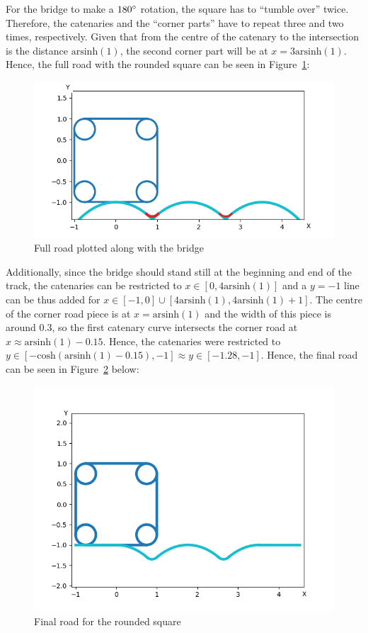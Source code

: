 \documentclass[12pt]{article}
\begin{document}
        For the bridge to make a $180\degree$ rotation, the square has to ``tumble over'' twice. Therefore, the catenaries and the ``corner parts'' have to repeat three and two times, respectively. Given that from the centre of the catenary to the intersection is the distance $\text{arsinh}(1)$, the second corner part will be at $x=3\text{arsinh}(1)$. Hence, the full road with the rounded square can be seen in Figure~\ref{fig:bridge_full}:
        \begin{figure}[H]
            \centering
            \includegraphics[width=0.75\linewidth]{images/road_with_square.png}
            \caption{Full road plotted along with the bridge}\label{fig:bridge_full}
        \end{figure}

        Additionally, since the bridge should stand still at the beginning and end of the track, the catenaries can be restricted to $x \in [0, 4\text{arsinh}(1)]$ and a $y=-1$ line can be thus added for $x \in [-1, 0] \cup [4\text{arsinh}(1), 4\text{arsinh}(1)+1]$. The centre of the corner road piece is at $x=\text{arsinh}(1)$ and the width of this piece is around $0.3$, so the first catenary curve intersects the corner road at $x \approx \text{arsinh}(1) - 0.15$. Hence, the catenaries were restricted to $y\in [-\text{cosh}(\text{arsinh}(1) - 0.15), -1] \approx y \in [-1.28, -1]$. Hence, the final road can be seen in Figure~\ref{fig:bridge_final} below:

        \begin{figure}[H]
            \centering
            \includegraphics[width=0.8\linewidth]{images/road_square_final.png}
            \caption{Final road for the rounded square}\label{fig:bridge_final}
        \end{figure}
\end{document}
